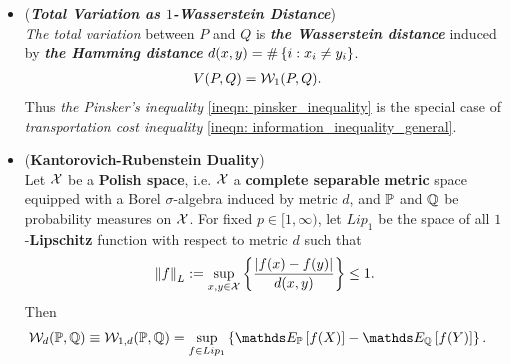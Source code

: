 \documentclass[11pt]{article}
\begin{document}
\begin{itemize}
\item \begin{remark} (\textbf{\emph{Total Variation as $1$-Wasserstein Distance}})\\
\emph{The total variation} between $P$ and $Q$ is \emph{\textbf{the Wasserstein distance}} induced by \emph{\textbf{the Hamming distance}} $d(x, y) = \#\left\{i: x_i \neq y_i\right\}$.
\begin{align*}
V(P, Q) &= {\mathcal W}_1(P, Q).
\end{align*} Thus \emph{the Pinsker's inequality} \eqref{ineqn: pinsker_inequality} is the special case of \emph{transportation cost inequality} \eqref{ineqn: information_inequality_general}.
\end{remark}

\item \begin{theorem} (\textbf{Kantorovich-Rubenstein Duality}) \citep{villani2009optimal}\\
Let ${\mathcal X}$ be a \textbf{Polish space}, i.e. ${\mathcal X}$ a \textbf{complete separable} \textbf{metric} space equipped with a Borel $\sigma$-algebra induced by metric $d$, and ${\mathbb P}$ and ${\mathbb Q}$ be probability measures on ${\mathcal X}$. For fixed $p \in [1, \infty)$, let $Lip_1$ be the space of all 
$1$-\textbf{Lipschitz} function with respect to metric $d$  such that
\begin{align*}
\left\|f\right\|_{L}  := \sup_{x, y \in {\mathcal X}}\left\{\frac{\left\lvert f(x) - f(y) \right\rvert}{d(x, y)}\right\} \le 1.
\end{align*}
Then 
\begin{align}
\cW_{d}(\bP, \bQ) \equiv \cW_{1,d}(\bP, \bQ) &= \sup_{f \in Lip_1}\set{\E{\bP}{f(X)} - \E{\bQ}{f(Y)}}. \label{eqn: wass_dist_dual}
\end{align} 
\end{theorem}
\end{itemize}
\end{document}
